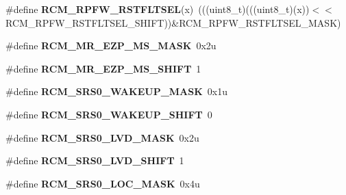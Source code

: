 \begin{DoxyCompactItemize}
\item 
\#define {\bfseries R\+C\+M\+\_\+\+R\+P\+F\+W\+\_\+\+R\+S\+T\+F\+L\+T\+S\+EL}(x)~(((uint8\+\_\+t)(((uint8\+\_\+t)(x))$<$$<$R\+C\+M\+\_\+\+R\+P\+F\+W\+\_\+\+R\+S\+T\+F\+L\+T\+S\+E\+L\+\_\+\+S\+H\+I\+FT))\&R\+C\+M\+\_\+\+R\+P\+F\+W\+\_\+\+R\+S\+T\+F\+L\+T\+S\+E\+L\+\_\+\+M\+A\+SK)\hypertarget{group__RCM__Register__Masks_ga2b2127fc8187199672452ef9f62f6a89}{}\label{group__RCM__Register__Masks_ga2b2127fc8187199672452ef9f62f6a89}

\item 
\#define {\bfseries R\+C\+M\+\_\+\+M\+R\+\_\+\+E\+Z\+P\+\_\+\+M\+S\+\_\+\+M\+A\+SK}~0x2u\hypertarget{group__RCM__Register__Masks_ga16d5d09d05454765c2097d0728ba9494}{}\label{group__RCM__Register__Masks_ga16d5d09d05454765c2097d0728ba9494}

\item 
\#define {\bfseries R\+C\+M\+\_\+\+M\+R\+\_\+\+E\+Z\+P\+\_\+\+M\+S\+\_\+\+S\+H\+I\+FT}~1\hypertarget{group__RCM__Register__Masks_ga3fd9237201ed39d58be104c022385815}{}\label{group__RCM__Register__Masks_ga3fd9237201ed39d58be104c022385815}

\item 
\#define {\bfseries R\+C\+M\+\_\+\+S\+R\+S0\+\_\+\+W\+A\+K\+E\+U\+P\+\_\+\+M\+A\+SK}~0x1u\hypertarget{group__RCM__Register__Masks_gacdeb6976064d599d6cd063b26a25dbda}{}\label{group__RCM__Register__Masks_gacdeb6976064d599d6cd063b26a25dbda}

\item 
\#define {\bfseries R\+C\+M\+\_\+\+S\+R\+S0\+\_\+\+W\+A\+K\+E\+U\+P\+\_\+\+S\+H\+I\+FT}~0\hypertarget{group__RCM__Register__Masks_ga2e140fc50106a6145cffe4b72671bbc2}{}\label{group__RCM__Register__Masks_ga2e140fc50106a6145cffe4b72671bbc2}

\item 
\#define {\bfseries R\+C\+M\+\_\+\+S\+R\+S0\+\_\+\+L\+V\+D\+\_\+\+M\+A\+SK}~0x2u\hypertarget{group__RCM__Register__Masks_ga4de74187b3bcc5b40a526b3ab5afda88}{}\label{group__RCM__Register__Masks_ga4de74187b3bcc5b40a526b3ab5afda88}

\item 
\#define {\bfseries R\+C\+M\+\_\+\+S\+R\+S0\+\_\+\+L\+V\+D\+\_\+\+S\+H\+I\+FT}~1\hypertarget{group__RCM__Register__Masks_gad3f4cb02d84182ddd0933dc93e1ec4ba}{}\label{group__RCM__Register__Masks_gad3f4cb02d84182ddd0933dc93e1ec4ba}

\item 
\#define {\bfseries R\+C\+M\+\_\+\+S\+R\+S0\+\_\+\+L\+O\+C\+\_\+\+M\+A\+SK}~0x4u\hypertarget{group__RCM__Register__Masks_ga0983314adae781518e2481ae518e14d8}{}\label{group__RCM__Register__Masks_ga0983314adae781518e2481ae518e14d8}


\end{DoxyCompactItemize}
